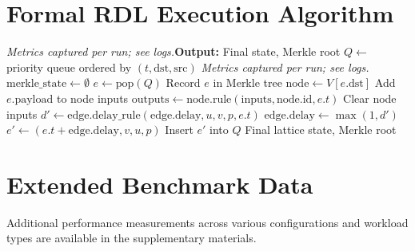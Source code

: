 \documentclass[conference]{IEEEtran}
\begin{document}
\appendix

\section{Formal RDL Execution Algorithm}

\begin{algorithmic}
\textit{Metrics captured per run; see logs.}\n\STATE \textbf{Output:} Final state, Merkle root
\STATE
\STATE $Q \leftarrow$ priority queue ordered by $(t, \text{dst}, \text{src})$
\textit{Metrics captured per run; see logs.}\n\STATE $\text{merkle\_state} \leftarrow \emptyset$
\STATE
{}
    \STATE $e \leftarrow \text{pop}(Q)$ 
    \STATE Record $e$ in Merkle tree
    \STATE $\text{node} \leftarrow V[e.\text{dst}]$
    \STATE Add $e.\text{payload}$ to node inputs
    \STATE $\text{outputs} \leftarrow \text{node.rule}(\text{inputs}, \text{node.id}, e.t)$
    \STATE Clear node inputs
            \STATE $d' \leftarrow \text{edge.delay\_rule}(\text{edge.delay}, u, v, p, e.t)$
            \STATE $\text{edge.delay} \leftarrow \max(1, d')$
            \STATE $e' \leftarrow (e.t + \text{edge.delay}, v, u, p)$
            \STATE Insert $e'$ into $Q$
        \ENDFOR
    \ENDFOR
\ENDWHILE
\STATE
\RETURN Final lattice state, Merkle root
\end{algorithmic}

\section{Extended Benchmark Data}

Additional performance measurements across various configurations and workload types are available in the supplementary materials.
\end{document}
